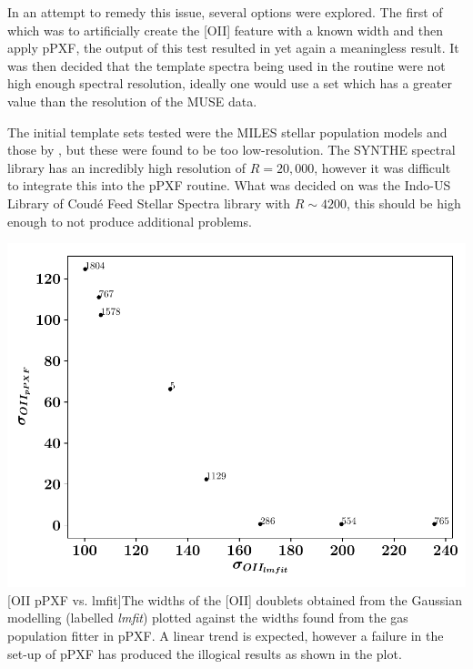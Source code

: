 \documentclass[12pt, twocolumn]{revtex4}    %
\begin{document}
In an attempt to remedy this issue, several options were explored. The first of which was to artificially create the [OII] feature with a known width and then apply pPXF, the output of this test resulted in yet again a meaningless result. It was then decided that the template spectra being used in the routine were not high enough spectral resolution, ideally one would use a set which has a greater value than the resolution of the MUSE data. 


The initial template sets tested were the MILES stellar population models \citep{vazdekis_miles} and those by \cite{jacoby_spectra}, but these were found to be too low-resolution. The SYNTHE spectral library \citep{munari_synthe} has an incredibly high resolution of $R=20,000$, however it was difficult to integrate this into the pPXF routine. What was decided on was the Indo-US Library of Coud{\'e} Feed Stellar Spectra \citep{valdes_coude} library with $R\sim4200$, this should be high enough to not produce additional problems.

\begin{center}
\includegraphics[width=1.0\linewidth]{data/oii_ppxf_vs_oii_lmfit}
[OII pPXF vs. lmfit]{The widths of the [OII] doublets obtained from the Gaussian modelling (labelled \textit{lmfit}) plotted against the widths found from the gas population fitter in pPXF. A linear trend is expected, however a failure in the set-up of pPXF has produced the illogical results as shown in the plot.}
\label{fig:oii_widths}
\end{center}
\end{document}
